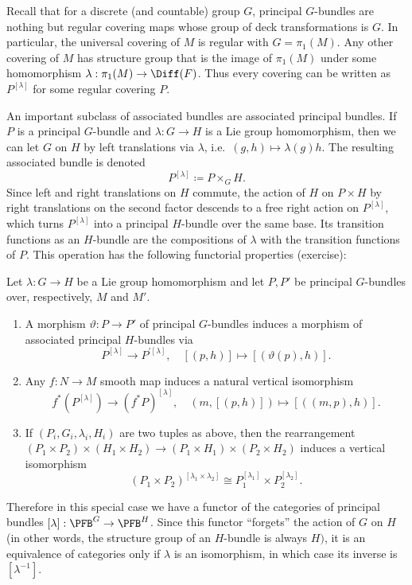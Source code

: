 \begin{example}
    Recall that for a discrete (and countable) group $G$, principal $G$-bundles are nothing but regular covering maps whose group of deck transformations is $G$. In particular, the universal covering of $M$ is regular with $G=\pi_1(M)$. Any other covering of $M$ has structure group that is the image of $\pi_1(M)$ under some homomorphism $\lambda:\pi_1(M)\to \Diff(F)$. Thus every covering can be written as $P^{[\lambda]}$ for some regular covering $P$.
\end{example}



An important subclass of associated bundles are associated principal bundles. If $P$ is a principal $G$-bundle and $\lambda:G\to H$ is a Lie group homomorphism, then we can let $G$ on $H$ by left translations via $\lambda$, i.e.\ $(g,h)\mapsto \lambda(g)h$. The resulting associated bundle is denoted
\[\boxed{P^{[\lambda]}\coloneqq P\times_G H.}\]
Since left and right translations on $H$ commute, the action of $H$ on $P\times H$ by right translations on the second factor descends to a free right action on $P^{[\lambda]}$, which turns $P^{[\lambda]}$ into a principal $H$-bundle over the same base. Its transition functions as an $H$-bundle are the compositions of $\lambda$ with the transition functions of $P$. This operation has the following functorial properties (exercise):
\begin{prop}
    Let $\lambda:G\to H$ be a Lie group homomorphism and let $P,P'$ be principal $G$-bundles over, respectively, $M$ and $M'$.
    \begin{enumerate}
        \item A morphism $\vartheta:P\to P'$ of principal $G$-bundles induces a morphism of associated principal $H$-bundles via
        \[P^{[\lambda]}\to P^{\prime[\lambda]},\quad [(p,h)]\mapsto \left[\left(\vartheta(p),h\right)\right].\]
        \item Any $f:N\to M$ smooth map induces a natural vertical isomorphism
        \[f^\ast\left(P^{[\lambda]}\right)\to (f^\ast P)^{[\lambda]},\quad \left(m,[(p,h)]\right)\mapsto \left[\left((m,p),h\right)\right].\]
        \item If $(P_i,G_i,\lambda_i,H_i)$ are two tuples as above, then the rearrangement $(P_1\times P_2)\times(H_1\times H_2)\to (P_1\times H_1)\times(P_2\times H_2)$ induces a vertical isomorphism
        \[\left(P_1\times P_2\right)^{[\lambda_1\times\lambda_2]}\cong P_1^{[\lambda_1]}\times P_2^{[\lambda_2]}.\]
    \end{enumerate}
\end{prop}
Therefore in this special case we have a functor of the categories of principal bundles $[\lambda]:\PFB^G\to \PFB^H$. Since this functor ``forgets'' the action of $G$ on $H$ (in other words, the structure group of an $H$-bundle is always $H)$, it is an equivalence of categories only if $\lambda$ is an isomorphism, in which case its inverse is $[\lambda^{-1}]$.


